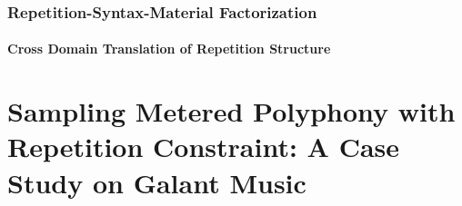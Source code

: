     \section{Repetition-Syntax-Material Factorization}
        \subsection{Cross Domain Translation of Repetition Structure}

%
%
\cleardoublepage
\part{Sampling Metered Polyphony with Repetition Constraint: A Case Study on Galant Music}

\cleardoublepage
{}

% 
% 
% 


